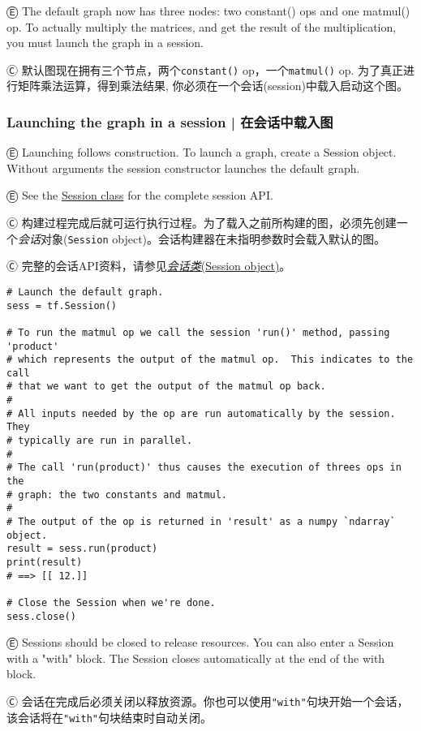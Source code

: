 Ⓔ \textcolor{etc}{The default graph now has three nodes: two constant() ops and one matmul() op. To actually multiply the matrices, and get the result of the multiplication, you must launch the graph in a session.}

Ⓒ 默认图现在拥有三个节点，两个\lstinline{constant()} op，一个\lstinline{matmul()} op. 为了真正进行矩阵乘法运算，得到乘法结果, 你必须在一个会话(session)中载入启动这个图。


\subsubsection {Launching the graph in a session  |  在会话中载入图} \label{launching_graph}

Ⓔ \textcolor{etc}{Launching follows construction. To launch a graph, create a Session object. Without arguments the session constructor launches the default graph.}

Ⓔ \textcolor{etc}{See the \hyperref[class-tf.session]{Session class} for the complete session API.}

Ⓒ 构建过程完成后就可运行执行过程。为了载入之前所构建的图，必须先创建一个\emph{会话}对象(\lstinline{Session} object)。会话构建器在未指明参数时会载入默认的图。

Ⓒ 完整的会话API资料，请参见\hyperref[class-tf.session]{\emph{会话类}(Session object)}。

\begin{lstlisting}
# Launch the default graph.
sess = tf.Session()

# To run the matmul op we call the session 'run()' method, passing 'product'
# which represents the output of the matmul op.  This indicates to the call
# that we want to get the output of the matmul op back.
#
# All inputs needed by the op are run automatically by the session.  They
# typically are run in parallel.
#
# The call 'run(product)' thus causes the execution of threes ops in the
# graph: the two constants and matmul.
#
# The output of the op is returned in 'result' as a numpy `ndarray` object.
result = sess.run(product)
print(result)
# ==> [[ 12.]]

# Close the Session when we're done.
sess.close()
\end{lstlisting}

Ⓔ \textcolor{etc}{Sessions should be closed to release resources. You can also enter a Session with a "with" block. The Session closes automatically at the end of the with block.}

Ⓒ 会话在完成后必须关闭以释放资源。你也可以使用\lstinline{"with"}句块开始一个会话，该会话将在\lstinline{"with"}句块结束时自动关闭。

